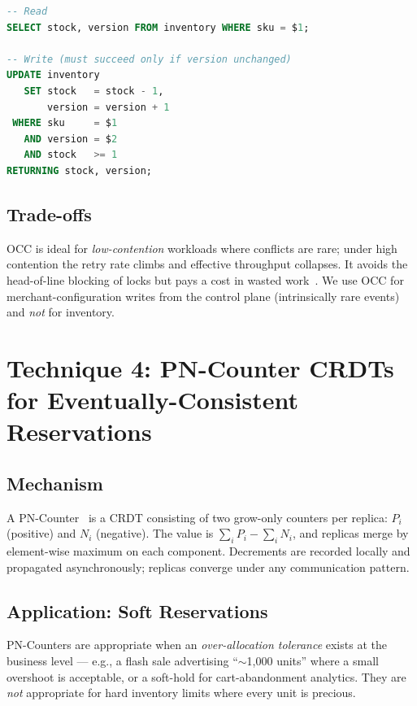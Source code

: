 \begin{lstlisting}[language=SQL, caption=Versioned conditional update (PostgreSQL)]
-- Read
SELECT stock, version FROM inventory WHERE sku = $1;

-- Write (must succeed only if version unchanged)
UPDATE inventory
   SET stock   = stock - 1,
       version = version + 1
 WHERE sku     = $1
   AND version = $2
   AND stock   >= 1
RETURNING stock, version;
\end{lstlisting}

\subsection{Trade-offs}
OCC is ideal for \emph{low-contention} workloads where conflicts are rare; under high contention the retry rate climbs and effective throughput collapses. It avoids the head-of-line blocking of locks but pays a cost in wasted work~\cite{wang2024optiql, zhou2025ccaas}. We use OCC for merchant-configuration writes from the control plane (intrinsically rare events) and \emph{not} for inventory.

\section{Technique 4: PN-Counter CRDTs for Eventually-Consistent Reservations}

\subsection{Mechanism}
A PN-Counter~\cite{shapiro2011crdt, duncan2025crdt} is a CRDT consisting of two grow-only counters per replica: $P_i$ (positive) and $N_i$ (negative). The value is $\sum_i P_i - \sum_i N_i$, and replicas merge by element-wise maximum on each component. Decrements are recorded locally and propagated asynchronously; replicas converge under any communication pattern.

\subsection{Application: Soft Reservations}
PN-Counters are appropriate when an \emph{over-allocation tolerance} exists at the business level --- e.g., a flash sale advertising ``$\sim$1{,}000 units'' where a small overshoot is acceptable, or a soft-hold for cart-abandonment analytics. They are \emph{not} appropriate for hard inventory limits where every unit is precious.

